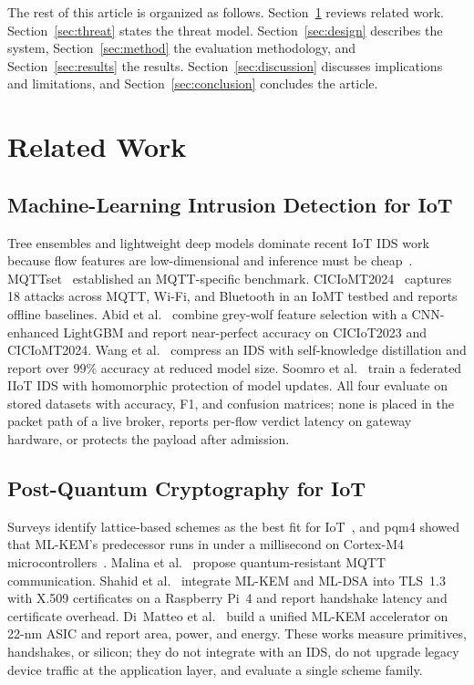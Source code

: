 \documentclass[journal]{IEEEtran}
\begin{document}
The rest of this article is organized as follows. Section~\ref{sec:related} reviews related work. Section~\ref{sec:threat} states the threat model. Section~\ref{sec:design} describes the system, Section~\ref{sec:method} the evaluation methodology, and Section~\ref{sec:results} the results. Section~\ref{sec:discussion} discusses implications and limitations, and Section~\ref{sec:conclusion} concludes the article.

\section{Related Work}
\label{sec:related}

\subsection{Machine-Learning Intrusion Detection for IoT}

Tree ensembles and lightweight deep models dominate recent IoT IDS work because flow features are low-dimensional and inference must be cheap~\cite{iot_ids_survey}. MQTTset~\cite{mqtt_ids_ml} established an MQTT-specific benchmark. CICIoMT2024~\cite{ciciomt2024} captures 18 attacks across MQTT, Wi-Fi, and Bluetooth in an IoMT testbed and reports offline baselines. Abid et al.~\cite{abid2025gwo} combine grey-wolf feature selection with a CNN-enhanced LightGBM and report near-perfect accuracy on CICIoT2023 and CICIoMT2024. Wang et al.~\cite{wang2025skd} compress an IDS with self-knowledge distillation and report over 99\% accuracy at reduced model size. Soomro et al.~\cite{soomro2025roche} train a federated IIoT IDS with homomorphic protection of model updates. All four evaluate on stored datasets with accuracy, F1, and confusion matrices; none is placed in the packet path of a live broker, reports per-flow verdict latency on gateway hardware, or protects the payload after admission.

\subsection{Post-Quantum Cryptography for IoT}

Surveys identify lattice-based schemes as the best fit for IoT~\cite{pqc_iot_survey}, and pqm4 showed that ML-KEM's predecessor runs in under a millisecond on Cortex-M4 microcontrollers~\cite{kyber_arm}. Malina et al.~\cite{malina2024mqttpqc} propose quantum-resistant MQTT communication. Shahid et al.~\cite{shahid2026pqtls} integrate ML-KEM and ML-DSA into TLS~1.3 with X.509 certificates on a Raspberry Pi~4 and report handshake latency and certificate overhead. Di~Matteo et al.~\cite{dimatteo2026kem22} build a unified ML-KEM accelerator on 22-nm ASIC and report area, power, and energy. These works measure primitives, handshakes, or silicon; they do not integrate with an IDS, do not upgrade legacy device traffic at the application layer, and evaluate a single scheme family.
\end{document}
